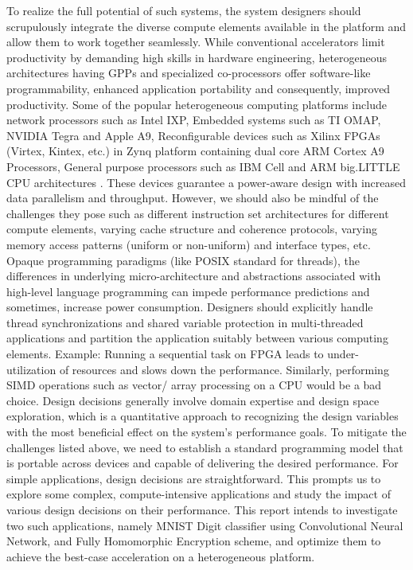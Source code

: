 To realize the full potential of such systems, the system designers should scrupulously integrate the diverse compute elements available in the platform and allow them to work together seamlessly. While conventional accelerators limit productivity by demanding high skills in hardware engineering, heterogeneous architectures having GPPs and specialized co-processors offer software-like programmability, enhanced application portability and consequently, improved productivity. Some of the popular heterogeneous computing platforms include network processors such as Intel IXP, Embedded systems such as TI OMAP, NVIDIA Tegra and Apple A9, Reconfigurable devices such as Xilinx FPGAs (Virtex, Kintex, etc.) in Zynq platform containing dual core ARM Cortex A9 Processors, General purpose processors such as IBM Cell and ARM big.LITTLE CPU architectures \cite{wiki_nanoscale}. \newline \newline
These devices guarantee a power-aware design with increased data parallelism and throughput. However, we should also be mindful of the challenges they pose such as different instruction set architectures for different compute elements, varying cache structure and coherence protocols, varying memory access patterns (uniform or non-uniform) and interface types, etc. \cite{wiki_nanoscale} Opaque programming paradigms (like POSIX standard for threads), the differences in underlying micro-architecture and abstractions associated with high-level language programming can impede performance predictions and sometimes, increase power consumption. Designers should explicitly handle thread synchronizations and shared variable protection in multi-threaded applications and partition the application suitably between various computing elements. Example: Running a sequential task on FPGA leads to under-utilization of resources and slows down the performance. Similarly, performing SIMD operations such as vector/ array processing on a CPU would be a bad choice. Design decisions generally involve domain expertise and design space exploration, which is a quantitative approach to recognizing the design variables with the most beneficial effect on the system’s performance goals. \newline \newline
To mitigate the challenges listed above, we need to establish a standard programming model that is portable across devices and capable of delivering the desired performance. 
For simple applications, design decisions are straightforward. This prompts us to explore some complex, compute-intensive applications and study the impact of various design decisions on their performance. This report intends to investigate two such applications, namely MNIST Digit classifier using Convolutional Neural Network, and Fully Homomorphic Encryption scheme, and optimize them to achieve the best-case acceleration on a heterogeneous platform. 

